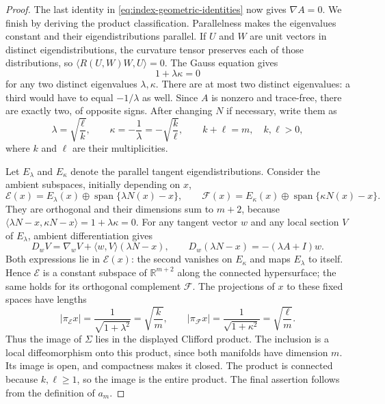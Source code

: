\begin{proof}
The last identity in \eqref{eq:index-geometric-identities} now gives
$\nabla A=0$.  We finish by deriving the product classification.
Parallelness makes the eigenvalues constant and their eigendistributions
parallel.  If $U$ and $W$ are unit vectors in distinct eigendistributions,
the curvature tensor preserves each of those distributions, so
$\langle R(U,W)W,U\rangle=0$.  The Gauss equation gives
\[
 1+\lambda\kappa=0
\]
for any two distinct eigenvalues $\lambda,\kappa$.  There are at most
two distinct eigenvalues: a third would have to equal $-1/\lambda$ as
well.  Since $A$ is nonzero and trace-free, there are exactly two, of
opposite signs.  After changing $N$ if necessary, write them as
\[
 \lambda=\sqrt{\frac{\ell}{k}},\qquad
 \kappa=-\frac1\lambda=-\sqrt{\frac{k}{\ell}},
 \qquad k+\ell=m,\quad k,\ell>0,
\]
where $k$ and $\ell$ are their multiplicities.

Let $E_\lambda$ and $E_\kappa$ denote the parallel tangent
eigendistributions.  Consider the ambient subspaces, initially depending
on $x$,
\[
 \mathcal E(x)=E_\lambda(x)\oplus\operatorname{span}\{\lambda N(x)-x\},
 \qquad
 \mathcal F(x)=E_\kappa(x)\oplus\operatorname{span}\{\kappa N(x)-x\}.
\]
They are orthogonal and their dimensions sum to $m+2$, because
$\langle\lambda N-x,\kappa N-x\rangle=1+\lambda\kappa=0$.
For any tangent vector $w$ and any local section $V$ of $E_\lambda$,
ambient differentiation gives
\[
 D_wV=\nabla_wV+\langle w,V\rangle(\lambda N-x),
 \qquad
 D_w(\lambda N-x)=-(\lambda A+I)w.
\]
Both expressions lie in $\mathcal E(x)$: the second vanishes on
$E_\kappa$ and maps $E_\lambda$ to itself.  Hence $\mathcal E$ is a
constant subspace of $\mathbb R^{m+2}$ along the connected hypersurface;
the same holds for its orthogonal complement $\mathcal F$.
The projections of $x$ to these fixed spaces have lengths
\[
 |\pi_{\mathcal E}x|=\frac1{\sqrt{1+\lambda^2}}
                    =\sqrt{\frac{k}{m}},
 \qquad
 |\pi_{\mathcal F}x|=\frac1{\sqrt{1+\kappa^2}}
                    =\sqrt{\frac{\ell}{m}}.
\]
Thus the image of $\Sigma$ lies in the displayed Clifford product.
The inclusion is a local diffeomorphism onto this product, since both
manifolds have dimension $m$.  Its image is open, and compactness makes
it closed.  The product is connected because $k,\ell\ge1$, so the image
is the entire product.  The final assertion follows from the definition
of $a_m$.
\end{proof}
